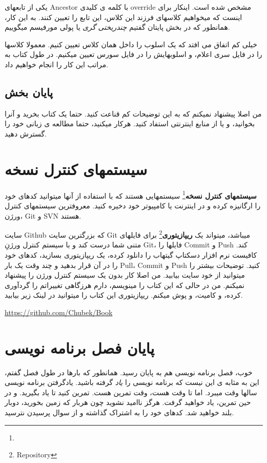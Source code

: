 \documentclass[14pt,a4paper]{memoir}
\begin{document}
یکی از تابعهای Ancestor با کلمه ی کلیدی override مشخص شده است. اینکار برای اینست که میخواهیم کلاسهای فرزند این کلاس، این تابع را تعیین کنند. به این کار، همانطور که در بخش پایتان گفتیم \textit{چندریختی گری} یا پولی مورفیسم میگوییم.

خیلی کم اتفاق می افتد که یک اسلوب را داخل همان کلاس تعیین کنیم. معمولا کلاسها را در فایل سری اعلام، و اسلوبهایش را در فایل سورس تعیین میکنیم. در طول کتاب به مراتب این کار را انجام خواهیم داد.


	 
	 
	 
	 \subsection{پایان بخش }
	 
	من اصلا پیشنهاد نمیکنم که به این توضیحات کم قناعت کنید. حتما یک کتاب بخرید و آنرا بخوانید، و یا از منابع اینترنتی استفاد کنید. هرکار میکنید، حتما مطالعه ی زبانی خود را گسترش دهید.
	
	
	
	\section{سیستمهای کنترل نسخه}\label{revcontrol}
	 
	 \textbf{سیستمهای کنترل نسخه}\footnote{} سیستمهایی هستند که با استفاده از آنها میتوانید کدهای خود را ارگانیزه کرده و در اینترنت یا کامپیوتر خود دخیره کنید. معروفترین سیستمهای کنترل ورژن، Git و SVN هستند.
	 
	 سایت Github که بزرگترین سایت Git میباشد، میتواند یک \textbf{ریپازیتوری}\footnote{Repository} برای فایلهای متنی شما درست کند و با سیستم کنترل ورژنِ Git، فایلها را Commit و Push کند. کافیست نرم افزار دسکتاپ گیتهاب را دانلود کرده، یک ریپازیتوری بسازید، کدهای خود را در آن قرار بدهید و چند وقت یک بار Pull، Commit و Push کنید. توضیحات بیشتر را میتوانید از خود سایت بیابید. من اصلا کار بدون یک سیستم کنترل ورژن را پیشنهاد نمیکنم. من در حالی که این کتاب را مینویسم، دارم هرزگاهی تغییراتم را گردآوری کرده، و کامیت، و پوش میکنم. ریپازیتوری این کتاب را میتوانید در لینک زیر بیابید.
	 
	 \url{https://github.com/Chubek/Book}
	 
	 \section{پایان فصل برنامه نویسی}
	 خوب، فصل برنامه نویسی هم به پایان رسید. همانطور که بارها در طول فصل گفتم، این به مثابه ی این نیست که برنامه نویسی را \textit{یاد} گرفته باشید. یادگرفتن برنامه نویسی سالها وقت میبرد. اما تا وقت هست، وقت تمرین هست. تمرین کنید تا یاد بگیرید. و در حین تمرین، یاد خواهید گرفت. هرگز ناامید نشوید چون هربار که زمین بخورید، دوبار بلند خواهید شد. کدهای خود را به اشتراک گذاشته و از سوال پرسیدن نترسید. 
	 
\end{document}
